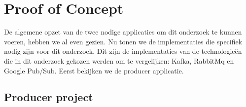 
\chapter{Proof of Concept}
\label{ch:proof-of-concept}




De algemene opzet van de twee nodige applicaties om dit onderzoek te kunnen voeren, hebben we al even gezien. Nu tonen we de implementaties die specifiek nodig zijn voor dit onderzoek. Dit zijn de implementaties van de technologieën die in dit onderzoek gekozen werden om te vergelijken: Kafka, RabbitMq en Google Pub/Sub. Eerst bekijken we de producer applicatie.
\section{Producer project}

